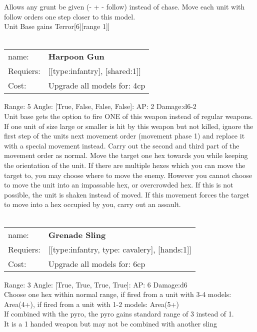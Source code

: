Allows any grunt be given (- + - follow) instead of chase. Move each unit with follow orders one step closer to this model.\\ 
Unit Base gains Terror[6][range 1]]\\ 









\ \\
\begin{tabular}{ll}
name: & {\bf Harpoon Gun } \\
Requiers: & [[type:infantry], [shared:1]] \\
Cost: & Upgrade all models for: 4cp \\
\end{tabular}



Range: 5  Angle: [True, False, False, False]: AP: 2 Damage:d6-2 \\
Unit base gets the option to fire ONE of this weapon instead of regular weapons.\\ 
If one unit of size large or smaller is hit by this weapon but not killed, ignore the first step of the units next movement order (movement phase 1) and replace it with a special movement instead. Carry out the second and third part of the movement order as normal. Move the target one hex towards you while keeping the orientation of the unit. If there are multiple hexes which you can move the target to, you may choose where to move the enemy. However you cannot choose to move the unit into an impassable hex, or overcrowded hex. If this is not possible, the unit is shaken instead of moved. If this movement forces the target to move into a hex occupied by you, carry out an assault.\\ 








\ \\
\begin{tabular}{ll}
name: & {\bf Grenade Sling } \\
Requiers: & [[type:infantry, type: cavalery], [hands:1]] \\
Cost: & Upgrade all models for: 6cp \\
\end{tabular}



Range: 3  Angle: [True, True, True, True]: AP: 6 Damage:d6 \\
Choose one hex within normal range, if fired from a unit with 3-4 models: Area(4+), if fired from a unit with 1-2 models: Area(5+)\\ 
If combined with the pyro, the pyro gains standard range of 3 instead of 1.\\ 
It is a 1 handed weapon but may not be combined with another sling\\ 








